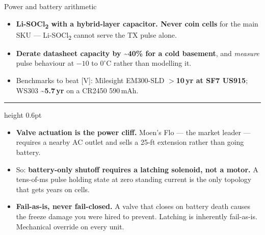 \documentclass[aspectratio=169,t,10pt,xcolor={table,svgnames}]{beamer}
\begin{document}
\begin{frame}{Power and battery arithmetic}
  \small
  \begin{itemize}
    \item \textbf{Li-SOCl\textsubscript{2} with a hybrid-layer capacitor. Never coin cells} for the
          main SKU --- Li-SOCl\textsubscript{2} cannot serve the TX pulse alone.
    \item \textbf{Derate datasheet capacity by \textasciitilde40\% for a cold basement}, and
          \emph{measure} pulse behaviour at $-10$ to $0^{\circ}$C rather than modelling it.
    \item Benchmarks to beat [V]: Milesight EM300-SLD \textbf{$>$10\,yr at SF7 US915};
          WS303 \textbf{\textasciitilde5.7\,yr} on a CR2450 590\,mAh.
  \end{itemize}
  \vspace{0.5em}
  {\color{hair}\hrule height 0.6pt}
  \vspace{0.5em}
  \begin{itemize}
    \item \textbf{Valve actuation is the power cliff.} Moen's Flo --- the market leader --- requires a
          nearby AC outlet and sells a 25-ft extension rather than going battery.
    \item So: \textbf{battery-only shutoff requires a latching solenoid, not a motor.} A
          tens-of-ms pulse holding state at zero standing current is the only topology that gets
          years on cells.
    \item \textbf{Fail-as-is, never fail-closed.} A valve that closes on battery death causes the
          freeze damage you were hired to prevent. Latching is inherently fail-as-is. Mechanical
          override on every unit.
  \end{itemize}
\end{frame}
\end{document}
